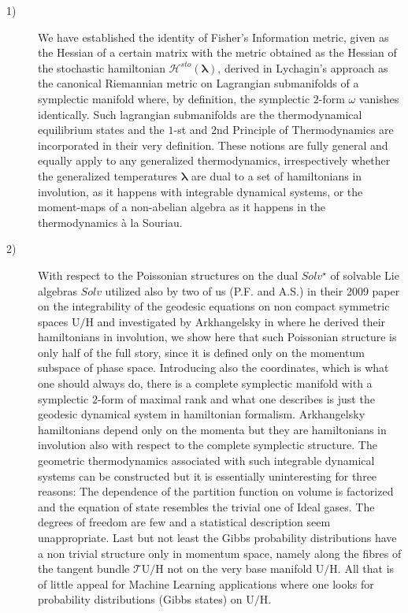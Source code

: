 \documentclass[10pt,a4paper]{article}
\begin{document}
\begin{description}
  \item[1)] We have established the identity of Fisher's Information metric, given as the Hessian of a certain matrix with the  metric obtained as the Hessian of the stochastic hamiltonian $\mathcal{H}^{sto}(\boldsymbol{\lambda})$,  derived in Lychagin's approach as the canonical Riemannian metric on Lagrangian submanifolds of a symplectic manifold where, by definition, the symplectic $2$-form $\omega$ vanishes identically. Such lagrangian submanifolds are the thermodynamical equilibrium states and the $1$-st and $2$nd Principle of Thermodynamics are incorporated in their very definition. These notions are fully general and equally apply to any generalized thermodynamics, irrespectively whether the generalized temperatures $\boldsymbol{\lambda}$ are dual to a set of hamiltonians in involution, as it happens with integrable dynamical systems, or the moment-maps of a non-abelian algebra as it happens in the thermodynamics {\`a} la Souriau.
  \item[2)] With respect to the Poissonian structures on the dual $Solv^\star$ of solvable Lie algebras $Solv$ utilized also by two of us (P.F. and A.S.) in their 2009 paper \cite{sashaebog} on the integrability of the geodesic equations on non compact symmetric spaces $\mathrm{U/H}$ and investigated by Arkhangelsky in
      \cite{arcangelo} where he derived their hamiltonians in involution, we show here that such Poissonian structure is only half of the full story, since it is defined only on the momentum subspace of phase space. Introducing also the coordinates, which is what one should always do, there is a complete symplectic manifold with a symplectic $2$-form of maximal rank and what one describes is just the geodesic dynamical system in hamiltonian formalism. Arkhangelsky hamiltonians depend only on the momenta but they are hamiltonians in involution also with respect to the complete symplectic structure. The geometric thermodynamics associated with such integrable dynamical systems can be constructed but it is essentially
      uninteresting for three reasons:
      \subitem[a] The dependence of the partition function on volume is factorized and the equation of state resembles the trivial one of Ideal gases.
      \subitem[b] The degrees of freedom are few and a statistical description seem unappropriate.
      \subitem[c] Last but not least the Gibbs probability distributions have a non trivial structure only in momentum space, namely along the fibres of the tangent bundle $\mathcal{T}\mathrm{U/H}$ not on the very base manifold $\mathrm{U/H}$. All that is of little appeal for Machine Learning applications where one looks for probability distributions (Gibbs states) on $\mathrm{U/H}$.

\end{description}
\end{document}
